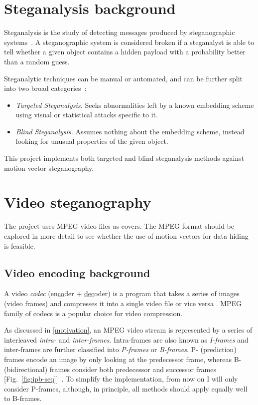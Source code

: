 \documentclass[12pt,british,twoside,notitlepage,usenames,dvipsnames,hypens,final]{report}
\numberwithin{equation}{section}
\numberwithin{figure}{section}
\begin{document}
\section{Steganalysis background}

Steganalysis is the study of detecting messages produced by steganographic systems~\cite[p.~10]{fridrich}. A steganographic system is considered broken if a steganalyst is able to tell whether a given object contains a hidden payload with a probability better than a random guess.

Steganalytic techniques can be manual or automated, and can be further split into two broad categories~\cite{bateman}:
\begin{itemize}
\item \emph{Targeted Steganalysis.} Seeks abnormalities left by a known embedding scheme using visual or statistical attacks specific to it.
\item \emph{Blind Steganalysis.} Assumes nothing about the embedding scheme, instead looking for unusual properties of the given object. 
\end{itemize} 

This project implements both targeted and blind steganalysis methods against motion vector steganography.

\section{Video steganography}

The project uses MPEG video files as covers. The MPEG format should be explored in more detail to see whether the use of motion vectors for data hiding is feasible.

\subsection{Video encoding background}

A video \emph{codec} (en\underline{co}der + \underline{dec}oder) is a program that takes a series of images (video frames) and compresses it into a single video file or vice versa \cite[sec.~3.1]{richardson2004h}. MPEG family of codecs is a popular choice for video compression.

As discussed in \ref{motivation}, an MPEG video stream is represented by a series of interleaved \emph{intra-} and \emph{inter-frames}. Intra-frames are also known as \emph{I-frames} and inter-frames are further classified into \emph{P-frames} or \emph{B-frames}. P- (prediction) frames encode an image by only looking at the predecessor frame, whereas B- (bidirectional) frames consider both predecessor and successor frames [Fig.~\ref{fig:ipb-seq}]~\cite{crowcroft1999internetworking}. To simplify the implementation, from now on I will only consider P-frames, although, in principle, all methods should apply equally well to B-frames.
\end{document}
